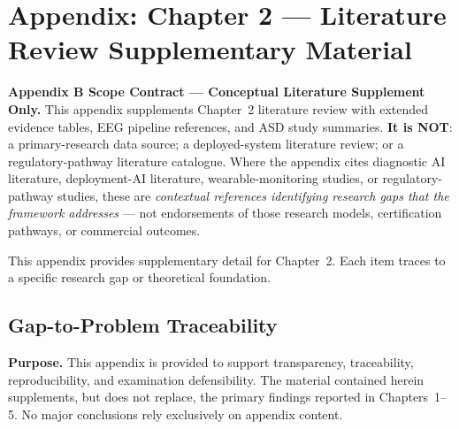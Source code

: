 
\chapter*{Appendix: Chapter 2 --- Literature Review Supplementary Material}
\label{chap:appendix_ch2}
\normalsize\normalfont\color{black}

\noindent\textbf{Appendix B Scope Contract --- Conceptual Literature Supplement Only.}
\label{para:appb_scope_contract}
This appendix supplements Chapter~2 literature review with extended evidence tables, EEG pipeline references, and ASD study summaries. \textbf{It is NOT}: a primary-research data source; a deployed-system literature review; or a regulatory-pathway literature catalogue. Where the appendix cites diagnostic AI literature, deployment-AI literature, wearable-monitoring studies, or regulatory-pathway studies, these are \emph{contextual references identifying research gaps that the framework addresses} --- not endorsements of those research models, certification pathways, or commercial outcomes.

This appendix provides supplementary detail for Chapter~2. Each item traces to a specific research gap or theoretical foundation.

\label{fig:appendix_ch2_taskflow}
\label{fig:eeg_pipeline}
\label{tab:app_asd_top_studies}
\label{tab:asd_accuracy_trends}
\label{fig:cwt_scalogram}
\label{fig:lab_field_degradation}
\label{sec:appendix_ch2_s1}
\label{sec:appendix_ch2_s2}

\section{Gap-to-Problem Traceability}


\noindent\textbf{Purpose.} This appendix is provided to support transparency, traceability, reproducibility, and examination defensibility. The material contained herein supplements, but does not replace, the primary findings reported in Chapters~1--5. No major conclusions rely exclusively on appendix content.


